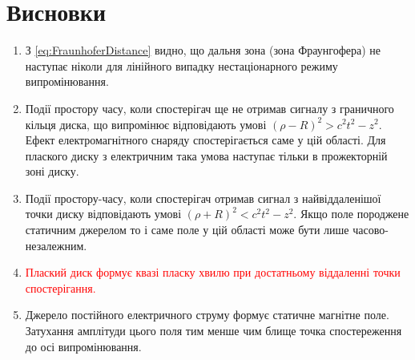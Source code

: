 \chapter*{Висновки}

\begin{enumerate}
%
\item З \eqref{eq:FraunhoferDistance} видно, що дальня зона (зона Фраунгофера) не 
наступає ніколи для лінійного випадку нестаціонарного режиму випромінювання.
%
\item Події простору часу, коли спостерігач ще не отримав сигналу з граничного кільця
диска, що випромінює відповідають умові $ (\rho - R)^2 > c^2 t^2 - z^2 $. 
Ефект електромагнітного снаряду спостерігається саме у цій області. Для плаского 
диску з електричним така умова наступає тільки в прожекторній зоні диску.
%
\item Події простору-часу, коли спостерігач отримав сигнал з найвіддаленішої точки  
диску відповідають умові $ (\rho + R)^2 < c^2 t^2 - z^2 $. Якщо поле породжене 
статичним джерелом то і саме поле у цій області може бути лише часово-незалежним.
%
\item \textcolor{red}{ Плаский диск формує квазі пласку хвилю при достатньому 
віддаленні точки спостерігання. }
%
\item Джерело постійного електричного струму формує статичне магнітне поле. 
Затухання амплітуди цього поля тим менше чим блище точка спостереження до осі 
випромінювання.
%
\end{enumerate}
%

